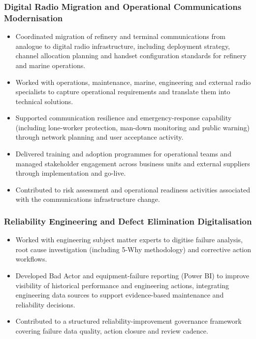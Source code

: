 \documentclass[11pt,a4paper]{article}
\begin{document}
\subsubsection*{Digital Radio Migration and Operational Communications Modernisation}
\begin{itemize}
    \item Coordinated migration of refinery and terminal communications from
          analogue to digital radio infrastructure, including deployment
          strategy, channel allocation planning and handset configuration
          standards for refinery and marine operations.
    \item Worked with operations, maintenance, marine, engineering and
          external radio specialists to capture operational requirements and
          translate them into technical solutions.
    \item Supported communication resilience and emergency-response capability
          (including lone-worker protection, man-down monitoring and public
          warning) through network planning and user acceptance activity.
    \item Delivered training and adoption programmes for operational teams and
          managed stakeholder engagement across business units and external
          suppliers through implementation and go-live.
    \item Contributed to risk assessment and operational readiness activities
          associated with the communications infrastructure change.
\end{itemize}

\subsubsection*{Reliability Engineering and Defect Elimination Digitalisation}
\begin{itemize}
    \item Worked with engineering subject matter experts to digitise failure
          analysis, root cause investigation (including 5-Why methodology) and
          corrective action workflows.
    \item Developed Bad Actor and equipment-failure reporting (Power BI) to
          improve visibility of historical performance and engineering
          actions, integrating engineering data sources to support
          evidence-based maintenance and reliability decisions.
    \item Contributed to a structured reliability-improvement governance
          framework covering failure data quality, action closure and review
          cadence.
\end{itemize}
\end{document}
